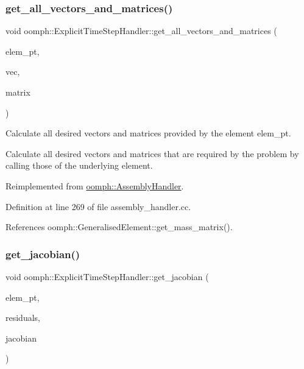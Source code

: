 \subsubsection{\texorpdfstring{get\+\_\+all\+\_\+vectors\+\_\+and\+\_\+matrices()}{get\_all\_vectors\_and\_matrices()}}
{\footnotesize\ttfamily void oomph\+::\+Explicit\+Time\+Step\+Handler\+::get\+\_\+all\+\_\+vectors\+\_\+and\+\_\+matrices (\begin{DoxyParamCaption}\item[{\hyperlink{classoomph_1_1GeneralisedElement}{Generalised\+Element} $\ast$const \&}]{elem\+\_\+pt,  }\item[{\hyperlink{classoomph_1_1Vector}{Vector}$<$ \hyperlink{classoomph_1_1Vector}{Vector}$<$ double $>$ $>$ \&}]{vec,  }\item[{\hyperlink{classoomph_1_1Vector}{Vector}$<$ \hyperlink{classoomph_1_1DenseMatrix}{Dense\+Matrix}$<$ double $>$ $>$ \&}]{matrix }\end{DoxyParamCaption})\hspace{0.3cm}{\ttfamily [virtual]}}



Calculate all desired vectors and matrices provided by the element elem\+\_\+pt. 

Calculate all desired vectors and matrices that are required by the problem by calling those of the underlying element. 

Reimplemented from \hyperlink{classoomph_1_1AssemblyHandler_ab2e4ee4623116b18245ca90cfe9ba144}{oomph\+::\+Assembly\+Handler}.



Definition at line 269 of file assembly\+\_\+handler.\+cc.



References oomph\+::\+Generalised\+Element\+::get\+\_\+mass\+\_\+matrix().

\mbox{\label{classoomph_1_1ExplicitTimeStepHandler_ad2c849833e4b35199a79d9d9965af32f}} 
\subsubsection{\texorpdfstring{get\+\_\+jacobian()}{get\_jacobian()}}
{\footnotesize\ttfamily void oomph\+::\+Explicit\+Time\+Step\+Handler\+::get\+\_\+jacobian (\begin{DoxyParamCaption}\item[{\hyperlink{classoomph_1_1GeneralisedElement}{Generalised\+Element} $\ast$const \&}]{elem\+\_\+pt,  }\item[{\hyperlink{classoomph_1_1Vector}{Vector}$<$ double $>$ \&}]{residuals,  }\item[{\hyperlink{classoomph_1_1DenseMatrix}{Dense\+Matrix}$<$ double $>$ \&}]{jacobian }\end{DoxyParamCaption})\hspace{0.3cm}{\ttfamily [virtual]}}



